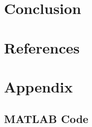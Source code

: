 \documentclass[12pt]{article}
\begin{document}
\section{Conclusion}

\section*{References}
\newpage
\section*{Appendix}

\subsection*{MATLAB Code}
%
\end{document}
